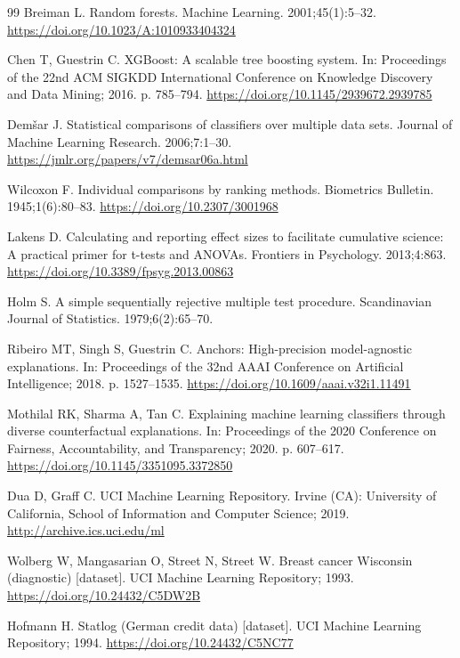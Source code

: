 \documentclass[11pt,a4paper]{article}
\begin{document}
\begin{thebibliography}{99}
Breiman L. Random forests. Machine Learning. 2001;45(1):5--32.
\url{https://doi.org/10.1023/A:1010933404324}

Chen T, Guestrin C. XGBoost: A scalable tree boosting system. In: Proceedings
of the 22nd ACM SIGKDD International Conference on Knowledge Discovery and
Data Mining; 2016. p. 785--794.
\url{https://doi.org/10.1145/2939672.2939785}

Dem\v{s}ar J. Statistical comparisons of classifiers over multiple data
sets. Journal of Machine Learning Research. 2006;7:1--30.
\url{https://jmlr.org/papers/v7/demsar06a.html}

Wilcoxon F. Individual comparisons by ranking methods. Biometrics Bulletin.
1945;1(6):80--83. \url{https://doi.org/10.2307/3001968}

Lakens D. Calculating and reporting effect sizes to facilitate cumulative
science: A practical primer for t-tests and ANOVAs. Frontiers in Psychology.
2013;4:863. \url{https://doi.org/10.3389/fpsyg.2013.00863}

Holm S. A simple sequentially rejective multiple test procedure.
Scandinavian Journal of Statistics. 1979;6(2):65--70.

Ribeiro MT, Singh S, Guestrin C. Anchors: High-precision model-agnostic
explanations. In: Proceedings of the 32nd AAAI Conference on Artificial
Intelligence; 2018. p. 1527--1535.
\url{https://doi.org/10.1609/aaai.v32i1.11491}

Mothilal RK, Sharma A, Tan C. Explaining machine learning classifiers through
diverse counterfactual explanations. In: Proceedings of the 2020 Conference
on Fairness, Accountability, and Transparency; 2020. p. 607--617.
\url{https://doi.org/10.1145/3351095.3372850}

Dua D, Graff C. UCI Machine Learning Repository. Irvine (CA): University of
California, School of Information and Computer Science; 2019.
\url{http://archive.ics.uci.edu/ml}

Wolberg W, Mangasarian O, Street N, Street W. Breast cancer Wisconsin
(diagnostic) [dataset]. UCI Machine Learning Repository; 1993.
\url{https://doi.org/10.24432/C5DW2B}

Hofmann H. Statlog (German credit data) [dataset]. UCI Machine Learning
Repository; 1994. \url{https://doi.org/10.24432/C5NC77}


\end{thebibliography}
\end{document}

